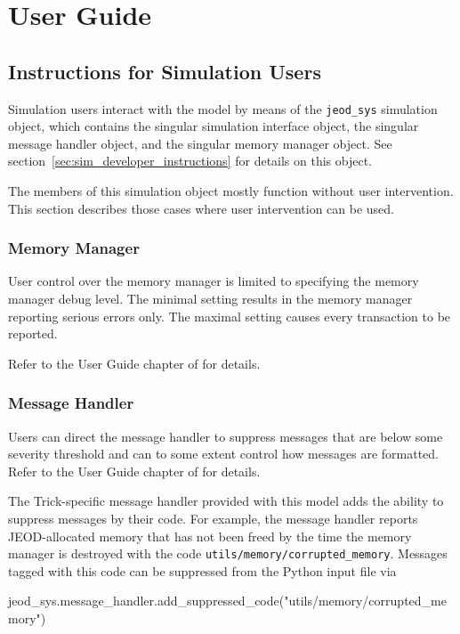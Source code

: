 %
%

\chapter{User Guide}\label{ch:user}

\section{Instructions for Simulation Users}
Simulation users interact with the model by means of the
\verb|jeod_sys| simulation object, which contains
the singular simulation interface object,
the singular message handler object, and
the singular memory manager object.
See section~\ref{sec:sim_developer_instructions} for details on this object.

The members of this simulation object mostly function without user intervention.
This section describes those cases where user intervention can be used.

\subsection{Memory Manager}
User control over the memory manager is limited to specifying the
memory manager debug level. The minimal setting results in the memory
manager reporting serious errors only. The maximal setting causes
every transaction to be reported.

Refer to the User Guide chapter of
 for details.

\subsection{Message Handler}
Users can direct the message handler to suppress messages that are
below some severity threshold and can to some extent control how
messages are formatted.
Refer to the User Guide chapter of
 for details.

The Trick-specific message handler provided with this model adds the
ability to suppress messages by their code. For example, the
message handler reports JEOD-allocated memory that has not
been freed by the time the memory manager is destroyed with
the code \verb|utils/memory/corrupted_memory|. Messages tagged
with this code can be suppressed from the Python input file via
\begin{codeblock}
jeod_sys.message_handler.add_suppressed_code("utils/memory/corrupted_memory")
\end{codeblock}



